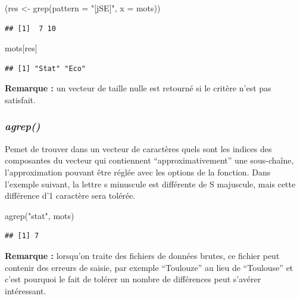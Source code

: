 \documentclass[
]{book}
\newenvironment{Shaded}{\begin{snugshade}}{\end{snugshade}}
\newcommand{\AttributeTok}[1]{\textcolor[rgb]{0.77,0.63,0.00}{#1}}
\newcommand{\FunctionTok}[1]{\textcolor[rgb]{0.00,0.00,0.00}{#1}}
\newcommand{\NormalTok}[1]{#1}
\newcommand{\OtherTok}[1]{\textcolor[rgb]{0.56,0.35,0.01}{#1}}
\newcommand{\StringTok}[1]{\textcolor[rgb]{0.31,0.60,0.02}{#1}}
\theoremstyle{definition}
\theoremstyle{definition}
\theoremstyle{definition}
\theoremstyle{definition}
\theoremstyle{remark}
\begin{document}
\begin{Shaded}
\begin{Highlighting}[]
\NormalTok{(res }\OtherTok{\textless{}{-}} \FunctionTok{grep}\NormalTok{(}\AttributeTok{pattern =} \StringTok{"[jSE]"}\NormalTok{, }\AttributeTok{x =}\NormalTok{ mots))}
\end{Highlighting}
\end{Shaded}

\begin{verbatim}
## [1]  7 10
\end{verbatim}

\begin{Shaded}
\begin{Highlighting}[]
\NormalTok{mots[res]}
\end{Highlighting}
\end{Shaded}

\begin{verbatim}
## [1] "Stat" "Eco"
\end{verbatim}

\textbf{Remarque :} un vecteur de taille nulle est retourné si le critère n'est pas satisfait.

\hypertarget{agrep}{%
\subsubsection{\texorpdfstring{\emph{agrep()}}{agrep()}}\label{agrep}}

Pemet de trouver dans un vecteur de caractères quels sont les indices des composantes du vecteur qui contiennent ``approximativement'' une sous-chaîne, l'approximation pouvant être réglée avec les options de la fonction. Dans l'exemple suivant, la lettre s minuscule est différente de S majuscule, mais cette différence d'1 caractère sera tolérée.

\begin{Shaded}
\begin{Highlighting}[]
\FunctionTok{agrep}\NormalTok{(}\StringTok{"stat"}\NormalTok{, mots)}
\end{Highlighting}
\end{Shaded}

\begin{verbatim}
## [1] 7
\end{verbatim}

\textbf{Remarque :} lorsqu'on traite des fichiers de données brutes, ce fichier peut contenir des erreurs de saisie, par exemple ``Toulouze'' au lieu de ``Toulouse'' et c'est pourquoi le fait de tolérer un nombre de différences peut s'avérer intéressant.
\end{document}
